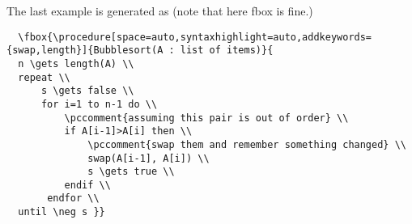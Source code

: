 \documentclass[a4paper]{report}
\begin{document}
  The last example is generated as (note that here fbox is fine.)
  \begin{lstlisting}
  \fbox{\procedure[space=auto,syntaxhighlight=auto,addkeywords={swap,length}]{Bubblesort(A : list of items)}{
  n \gets length(A) \\
  repeat \\
	  s \gets false \\
	  for i=1 to n-1 do \\
		  \pccomment{assuming this pair is out of order} \\
		  if A[i-1]>A[i] then \\
			  \pccomment{swap them and remember something changed} \\
			  swap(A[i-1], A[i]) \\
			  s \gets true \\
		  endif \\
	   endfor \\
  until \neg s }}
  \end{lstlisting}
  
\end{document}
